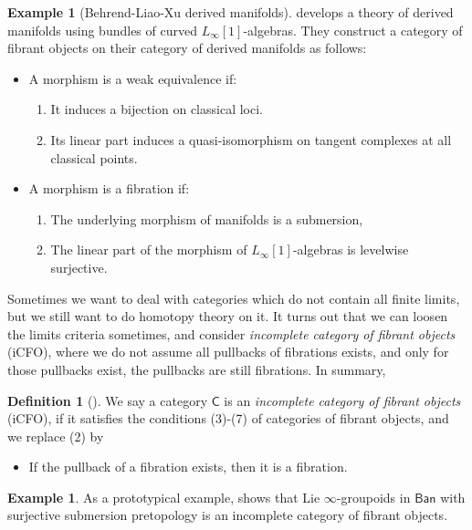 \documentclass[12pt]{amsart}
\theoremstyle{definition}
\newtheorem{example}[thm]{Example}
\newtheorem{defn}[thm]{Definition}
\theoremstyle{remark}
\numberwithin{equation}{section}
\newcommand{\CC}{{\mathsf C}}
\newcommand{\1}{{\mathbb{1}}}
\newcommand{\ban}{\mathsf{Ban}}
\newcommand{\li}{L_{\infty}}
\begin{document}
\begin{example}[Behrend-Liao-Xu derived manifolds]
    \cite{BLX21} develops a theory of derived manifolds using bundles of curved $\li[1]$-algebras. They construct a category of fibrant objects on their category of derived manifolds as follows:
    \begin{itemize}
        \item A morphism is a weak equivalence  if:
        \begin{enumerate}
            \item It induces a bijection on classical loci.
            \item Its linear part induces a quasi-isomorphism on tangent complexes at all classical points.
        \end{enumerate}
        \item A morphism is a fibration if:
            \begin{enumerate}
                \item  The underlying morphism of manifolds is a submersion,
                \item The linear part of the morphism of $\li[1]$-algebras is levelwise surjective.
            \end{enumerate}
    \end{itemize}
\end{example}
Sometimes we want to deal with categories which do not contain all finite limits, but we still want to do homotopy theory on it. It turns out that we can loosen the limits criteria sometimes, and consider {\it incomplete category of fibrant objects} (iCFO), where we do not assume all pullbacks of fibrations exists, and only for those pullbacks exist, the pullbacks are still fibrations. In summary,
\begin{defn}[\cite{RZ20}]
    We say a category $\CC$ is an {\it incomplete category of fibrant objects} (iCFO), if it satisfies the conditions (3)-(7) of categories of fibrant objects, and we replace (2) by
\begin{itemize}
    \item If the pullback of a fibration exists, then it is a fibration.
\end{itemize}
\end{defn}

\begin{example}
    As a prototypical example, \cite{RZ20} shows that Lie $\infty$-groupoids in $\ban$ with surjective submersion pretopology is an incomplete category of fibrant objects.
\end{example}
\end{document}

